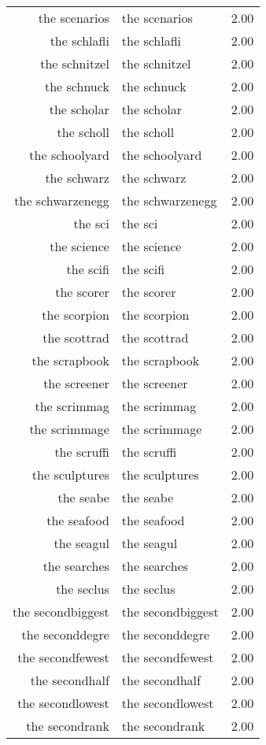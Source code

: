 \begin{table}[ht]
\begin{tabular}{rlr}
  the scenarios & the scenarios & 2.00 \\ 
  the schlafli & the schlafli & 2.00 \\ 
  the schnitzel & the schnitzel & 2.00 \\ 
  the schnuck & the schnuck & 2.00 \\ 
  the scholar & the scholar & 2.00 \\ 
  the scholl & the scholl & 2.00 \\ 
  the schoolyard & the schoolyard & 2.00 \\ 
  the schwarz & the schwarz & 2.00 \\ 
  the schwarzenegg & the schwarzenegg & 2.00 \\ 
  the sci & the sci & 2.00 \\ 
  the science & the science & 2.00 \\ 
  the scifi & the scifi & 2.00 \\ 
  the scorer & the scorer & 2.00 \\ 
  the scorpion & the scorpion & 2.00 \\ 
  the scottrad & the scottrad & 2.00 \\ 
  the scrapbook & the scrapbook & 2.00 \\ 
  the screener & the screener & 2.00 \\ 
  the scrimmag & the scrimmag & 2.00 \\ 
  the scrimmage & the scrimmage & 2.00 \\ 
  the scruffi & the scruffi & 2.00 \\ 
  the sculptures & the sculptures & 2.00 \\ 
  the seabe & the seabe & 2.00 \\ 
  the seafood & the seafood & 2.00 \\ 
  the seagul & the seagul & 2.00 \\ 
  the searches & the searches & 2.00 \\ 
  the seclus & the seclus & 2.00 \\ 
  the secondbiggest & the secondbiggest & 2.00 \\ 
  the seconddegre & the seconddegre & 2.00 \\ 
  the secondfewest & the secondfewest & 2.00 \\ 
  the secondhalf & the secondhalf & 2.00 \\ 
  the secondlowest & the secondlowest & 2.00 \\ 
  the secondrank & the secondrank & 2.00 \\ 

\end{tabular}
\end{table}
